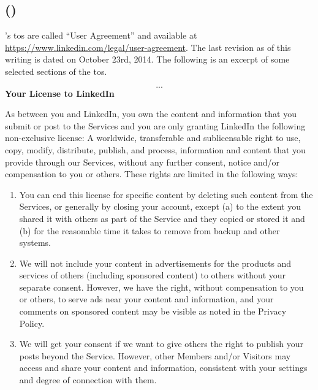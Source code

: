 \documentclass[showtrims,oldfontcommands]{kthesis}
\begin{document}
\begin{appendices}
    \section[\LinkedIn]{\LinkedIn (\LinkedInCorp)}
        \label{section:excerpts-linkedin}
    \LinkedIn's \acs{tos} are called ``User Agreement'' and available at \url{https://www.linkedin.com/legal/user-agreement}. 
    The last revision as of this writing is dated on October 23rd, 2014. The following 
    is an excerpt of some selected sections of the \ac{tos}.

    \begin{quote_tos}
        \[...\]
        \textbf{Your License to LinkedIn}
        
        As between you and LinkedIn, you own the content and information that you 
        submit or post to the Services and you are only granting LinkedIn the following 
        non-exclusive license: A worldwide, transferable and sublicensable right 
        to use, copy, modify, distribute, publish, and process, information and 
        content that you provide through our Services, without any further consent, 
        notice and/or compensation to you or others. These rights are limited in 
        the following ways:
        \begin{enumerate}[label=\alph*]
            \item You can end this license for specific content by deleting such 
            content from the Services, or generally by closing your account, except 
            (a) to the extent you shared it with others as part of the Service and 
            they copied or stored it and (b) for the reasonable time it takes to 
            remove from backup and other systems.
            \item We will not include your content in advertisements for the products 
            and services of others (including sponsored content) to others without 
            your separate consent. However, we have the right, without compensation 
            to you or others, to serve ads near your content and information, and 
            your comments on sponsored content may be visible as noted in the Privacy 
            Policy.
            \item We will get your consent if we want to give others the right to 
            publish your posts beyond the Service. However, other Members and/or 
            Visitors may access and share your content and information, consistent 
            with your settings and degree of connection with them.

\end{enumerate}
\end{quote_tos}
\end{appendices}
\end{document}
